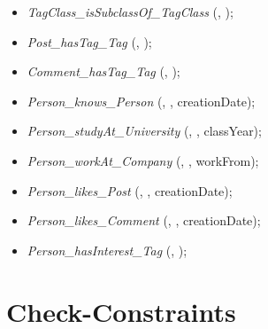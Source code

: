 \begin{itemize}
  \item \emph{TagClass\_isSubclassOf\_TagClass} (, );
  \item \emph{Post\_hasTag\_Tag} (, );
  \item \emph{Comment\_hasTag\_Tag} (, );
  \item \emph{Person\_knows\_Person} (, , creationDate);
  \item \emph{Person\_studyAt\_University} (, , classYear);
  \item \emph{Person\_workAt\_Company} (, , workFrom);
  \item \emph{Person\_likes\_Post} (, , creationDate);
  \item \emph{Person\_likes\_Comment} (, , creationDate);
  \item \emph{Person\_hasInterest\_Tag} (, );
\end{itemize}
\section*{Check-Constraints}
~

